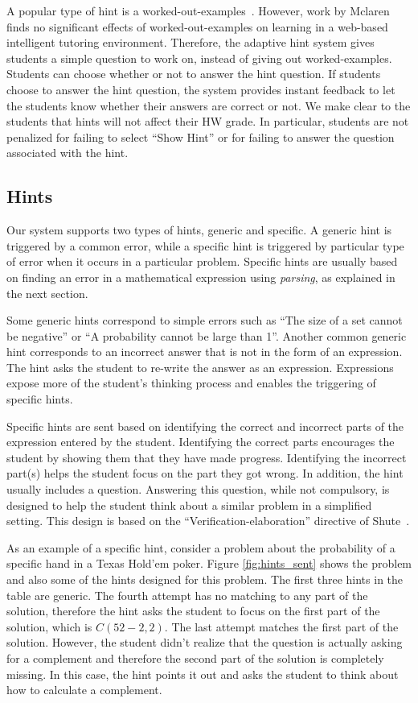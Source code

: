 \documentclass{llncs2e/llncs}
\begin{document}
A popular type of hint is a
worked-out-examples~\cite{Atkinson2000}. However, work by
Mclaren~\cite{McLaren2006} finds no significant effects of
worked-out-examples on learning in a web-based intelligent tutoring
environment. Therefore, the adaptive hint system gives students a
simple question to work on, instead of giving out
worked-examples. Students can choose whether or not to answer the hint
question. If students choose to answer the hint question, the system
provides instant feedback to let the students know whether their
answers are correct or not. We make clear to the students that hints
will not affect their HW grade. In particular, students are not
penalized for failing to select ``Show Hint'' or for failing to answer
the question associated with the hint.

\subsection*{Hints}

Our system supports two types of hints, generic and specific. A
generic hint is triggered by a common error, while a specific hint is
triggered by particular type of error when it occurs in a particular
problem. Specific hints are usually based on finding an error in a
mathematical expression using {\em parsing}, as explained in the next section.

Some generic hints correspond to simple errors such as ``The size of a
set cannot be negative'' or ``A probability cannot be large than
1''. Another common generic hint corresponds to an incorrect answer
that is not in the form of an expression. The hint asks the student to
re-write the answer as an expression.  Expressions expose more of the
student's thinking process and enables the triggering of specific hints.

Specific hints are sent based on identifying the correct and incorrect
parts of the expression entered by the student. Identifying the
correct parts encourages the student by showing them that they have
made progress. Identifying the incorrect part(s) helps the student
focus on the part they got wrong. In addition, the hint usually
includes a question. Answering this question, while not compulsory, is
designed to help the student think about a similar problem in a
simplified setting. This design is based on the
``Verification-elaboration'' directive of Shute~\cite{Shute2008}.

As an example of a specific hint, consider a problem about the
probability of a specific hand in a Texas Hold'em poker. Figure \ref{fig:hints_sent}
shows the problem and also some of the hints designed for this problem. The first three hints
in the table are generic. The fourth attempt has no matching to
any part of the solution, therefore the hint asks the student to focus
on the first part of the solution, which is $C(52-2,2)$. The last
attempt matches the first part of the solution. However, the student
didn't realize that the question is actually asking for a complement
and therefore the second part of the solution is completely
missing. In this case, the hint points it out and asks the student to
think about how to calculate a complement.
\end{document}

